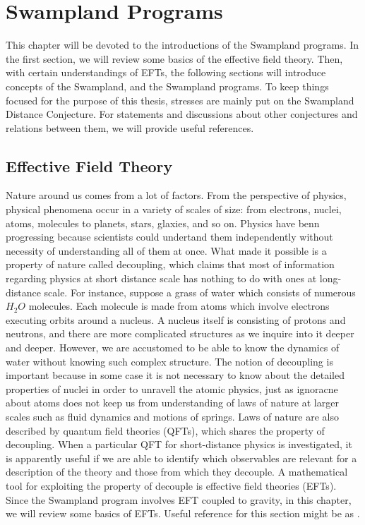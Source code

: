 \chapter{Swampland Programs}
\label{Chapter1}
This chapter will be devoted to the introductions of the Swampland programs. In the first section, we will review some basics of the effective field theory. Then, with certain understandings of EFTs, the following sections will introduce concepts of the Swampland, and the Swampland programs. To keep things focused for the purpose of this thesis, stresses are mainly put on the Swampland Distance Conjecture. For statements and discussions about other conjectures and relations between them, we will provide useful references.
\section{Effective Field Theory}
Nature around us comes from a lot of factors. From the perspective of physics, physical phenomena occur in a variety of scales of size: from electrons, nuclei, atoms, molecules to planets, stars, glaxies, and so on. Physics have benn progressing because scientists could undertand them independently without necessity of understanding all of them at once. What made it possible is a property of nature called decoupling, which claims that most of information regarding physics at short distance scale has nothing to do with ones at long-distance scale. For instance, suppose a grass of water which consists of numerous $H_{2} O$ molecules. Each molecule is made from atoms which involve electrons executing orbits around a nucleus. A nucleus itself is consisting of protons and neutrons, and there are more complicated structures as we inquire into it deeper and deeper. However, we are accustomed to be able to know the dynamics of water without knowing such complex structure. The notion of decoupling is important because in some case it is not necessary to know about the detailed properties of nuclei in order to unravell the atomic physics, just as ignoracne about atoms does not keep us from understanding of laws of nature at larger scales such as fluid dynamics and motions of springs. Laws of nature are also described by quantum field theories (QFTs), which shares the property of decoupling. When a particular QFT for short-distance physics is investigated, it is apparently useful if we are able to identify which observables are relevant for a description of the theory and those from which they decouple. A mathematical tool for exploiting the property of decouple is effective field theories (EFTs). Since the Swampland program involves EFT coupled to gravity, in this chapter, we will review some basics of EFTs. Useful reference for this section might be as \parencite{burgess_introduction_2020}. 
